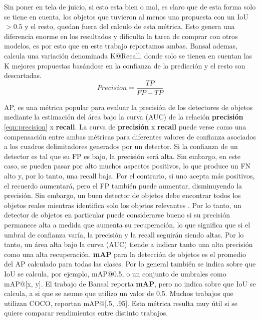 Sin poner en tela de juicio, si esto esta bien o mal, es claro que de esta forma solo se tiene en cuenta, los objetos que tuvieron al menos una propuesta con un IoU $> 0.5$ y el resto, quedan fuera del calculo de esta métrica. Esto genera una diferencia enorme en los resultados y dificulta la tarea de comprar con otros modelos, es  por esto que en este trabajo reportamos ambas. Bansal ademas, calcula una variación denominada K@Recall, donde solo se tienen en cuentan las K mejores propuestas basándose en la confianza de la predicción y el resto son descartadas.\\

\begin{equation} 
\label{eqn:precision}
Precision =\frac{TP}{FP+TP}
\end{equation}

AP, es una métrica popular para evaluar la precisión de los detectores de objetos mediante la estimación del área bajo la curva (AUC) de la relación \textbf{precisión} \ref{eqn:precision} x \textbf{recall}. La curva de \textbf{precisión} x \textbf{recall} puede verse como una compensación entre ambas métricas para diferentes valores de confianza asociados a los cuadros delimitadores generados por un detector. Si la confianza de un detector es tal que su FP es bajo, la precisión será alta. Sin embargo, en este caso, se pueden pasar por alto muchos aspectos positivos, lo que produce un FN alto y, por lo tanto, una recall baja. Por el contrario, si uno acepta más positivos, el recuerdo aumentará, pero el FP también puede aumentar, disminuyendo la precisión. Sin embargo, un buen detector de objetos debe encontrar todos los objetos reales  mientras identifica solo los objetos relevantes . Por lo tanto, un detector de objetos en particular puede considerarse bueno si su precisión permanece alta a medida que aumenta su recuperación, lo que significa que si el umbral de confianza varía, la precisión y la recall seguirán siendo altas. Por lo tanto, un área alta bajo la curva (AUC) tiende a indicar tanto una alta precisión como una alta recuperación. \textbf{mAP} para la detección de objetos es el promedio del AP calculado para todas las clases. Por lo general también se indica sobre que IoU se calcula, por ejemplo, mAP@0.5, o un conjunto de umbrales como mAP@[x, y]. El trabajo de Bansal reporta \textbf{mAP}, pero no indica sobre que IoU se calcula, a si que se asume que utilizo un valor de 0,5. Muchos trabajos que utilizan COCO, reportan mAP@[.5, .95]. Esta métrica resulta muy útil si se quiere comparar rendimientos entre distinto trabajos.


